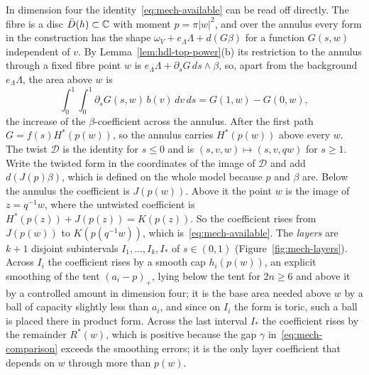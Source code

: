 In dimension four the identity~\eqref{eq:mech-available} can be read off directly. The fibre is a disc
$\bar D(h)\subset\mathbb{C}$ with moment $p=\pi|w|^2$, and over the annulus every form in the construction has the shape
$\omega_V+e_\Lambda\Lambda+d(G\beta)$ for a function $G(s,w)$ independent of $v$. By Lemma~\ref{lem:hdl-top-power}(b) its
restriction to the annulus through a fixed fibre point $w$ is $e_\Lambda\Lambda+\partial_sG\,ds\wedge\beta$, so, apart from
the background $e_\Lambda\Lambda$, the area above $w$ is
\[
 \int_0^1\!\!\int_0^1\partial_sG(s,w)\,b(v)\,dv\,ds=G(1,w)-G(0,w),
\]
the increase of the $\beta$-coefficient across the annulus. After the first path $G=f(s)H^*(p(w))$, so the annulus
carries $H^*(p(w))$ above every $w$. The twist $\mathcal D$ is the identity for $s\le0$ and is $(s,v,w)\mapsto(s,v,qw)$
for $s\ge1$. Write the twisted form in the coordinates of the image of $\mathcal D$ and add $d(J(p)\beta)$, which
is defined on the whole model because $p$ and $\beta$ are. Below the annulus the coefficient is $J(p(w))$. Above
it the point $w$ is the image of $z=q^{-1}w$, where the untwisted coefficient is $H^*(p(z))+J(p(z))=K(p(z))$. So the
coefficient rises from $J(p(w))$ to $K(p(q^{-1}w))$, which is~\eqref{eq:mech-available}. The \emph{layers} are $k+1$
disjoint subintervals $I_1,\dots,I_k,I_*$ of $s\in(0,1)$ (Figure~\ref{fig:mech-layers}). Across $I_i$ the
coefficient rises by a smooth cap $h_i(p(w))$, an explicit smoothing of the tent $(a_i-p)_+$, lying below the tent
for $2n\ge6$ and above it by a controlled amount in dimension four; it is the base area
needed above $w$ by a ball of capacity slightly less than $a_i$, and since on $I_i$ the form is toric, such a ball
is placed there in product form. Across the last interval $I_*$ the coefficient rises by the remainder $R^*(w)$,
which is positive because the gap $\gamma$ in~\eqref{eq:mech-comparison} exceeds the smoothing errors; it is the
only layer coefficient that depends on $w$ through more than $p(w)$.

